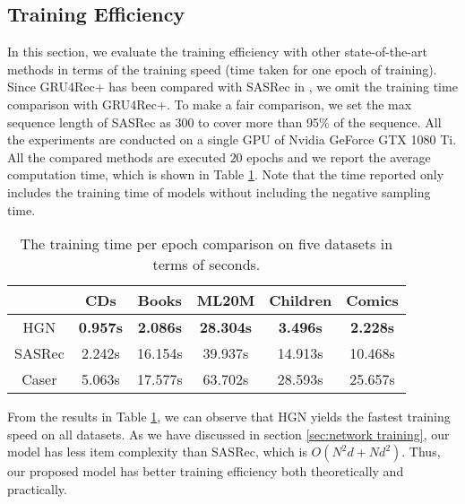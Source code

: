 \documentclass[sigconf]{acmart}
\begin{document}
\subsection{Training Efficiency} \label{sec:training_efficiency}
In this section, we evaluate the training efficiency with other state-of-the-art methods in terms of the training speed (time taken for one epoch of training). Since GRU4Rec+ has been compared with SASRec in \cite{DBLP:conf/icdm/KangM18}, we omit the training time comparison with GRU4Rec+. To make a fair comparison, we set the max sequence length of SASRec as $ 300 $ to cover more than 95\% of the sequence. All the experiments are conducted on a single GPU of Nvidia GeForce GTX 1080 Ti. All the compared methods are executed $ 20 $ epochs and we report the average computation time, which is shown in Table \ref{tab:training_time}. Note that the time reported only includes the training time of models without including the negative sampling time.

\begin{table}[ht]
\centering
\caption{\label{tab:training_time}The training time per epoch comparison on five datasets in terms of seconds.}
\begin{tabular}{ |c|c|c|c|c|c| }
 \hline
 & CDs & Books & ML20M & Children & Comics \\
\hline
HGN & \textbf{0.957s} & \textbf{2.086s} & \textbf{28.304s} & \textbf{3.496s} & \textbf{2.228s} \\
SASRec & 2.242s & 16.154s & 39.937s & 14.913s & 10.468s \\
Caser & 5.063s & 17.577s & 63.702s & 28.593s & 25.657s \\
\hline
\end{tabular}
\vspace{-0.3cm}
\end{table}

From the results in Table \ref{tab:training_time}, we can observe that HGN yields the fastest training speed on all datasets. As we have discussed in section \ref{sec:network training}, our model has less item complexity than SASRec, which is $ O(N^2d + Nd^2) $. Thus, our proposed model has better training efficiency both theoretically and practically.
\end{document}
